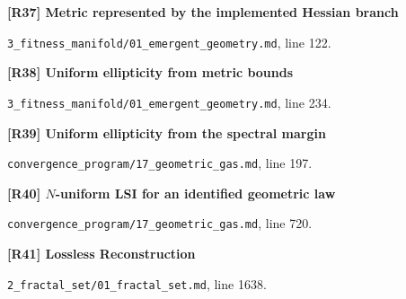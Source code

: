 \documentclass[11pt,a4paper]{article}
\begin{document}
\par\medskip\noindent\begin{minipage}{\linewidth}\textbf{[R37] Metric represented by the implemented Hessian branch}\label{src:prop-geometry-clipped-metric}\par
{\small\texttt{}\par
\nolinkurl{3_fitness_manifold/01_emergent_geometry.md}, line 122.\par}
\end{minipage}\par

\par\medskip\noindent\begin{minipage}{\linewidth}\textbf{[R38] Uniform ellipticity from metric bounds}\label{src:thm-uniform-ellipticity-latent}\par
{\small\texttt{}\par
\nolinkurl{3_fitness_manifold/01_emergent_geometry.md}, line 234.\par}
\end{minipage}\par

\par\medskip\noindent\begin{minipage}{\linewidth}\textbf{[R39] Uniform ellipticity from the spectral margin}\label{src:thm-gg-ueph-construction}\par
{\small\texttt{}\par
\nolinkurl{convergence_program/17_geometric_gas.md}, line 197.\par}
\end{minipage}\par

\par\medskip\noindent\begin{minipage}{\linewidth}\textbf{[R40] \(N\)-uniform LSI for an identified geometric law}\label{src:thm-gg-lsi-main}\par
{\small\texttt{}\par
\nolinkurl{convergence_program/17_geometric_gas.md}, line 720.\par}
\end{minipage}\par

\par\medskip\noindent\begin{minipage}{\linewidth}\textbf{[R41] Lossless Reconstruction}\label{src:thm-fractal-set-lossless}\par
{\small\texttt{}\par
\nolinkurl{2_fractal_set/01_fractal_set.md}, line 1638.\par}
\end{minipage}\par
\end{document}
